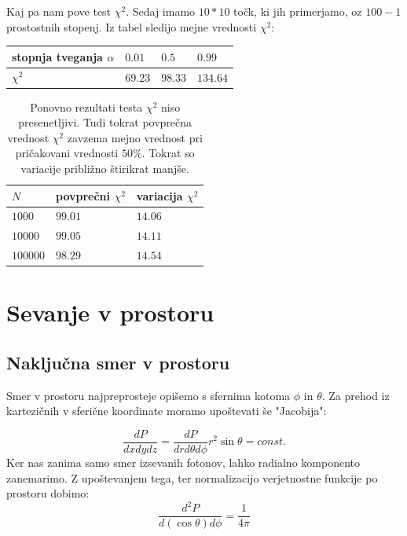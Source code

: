 \documentclass[slovene,11pt,a4paper]{article}
\numberwithin{equation}{section} %
\numberwithin{figure}{section} %
\numberwithin{table}{section} %
\begin{document}
Kaj pa nam pove test $\chi^2$. Sedaj imamo $10*10$ točk, ki jih primerjamo, oz $100-1$ prostostnih stopenj. Iz tabel sledijo mejne vrednosti $\chi^2$:

\begin{table}[!h]
\begin{center}
\begin{tabular}{|l|l|l|l|}
\hline
stopnja tveganja $\alpha$ & $0.01$ & $0.5$ & $0.99$ \\ \hline
$\chi^2$ & $69.23$ & $98.33$ & $134.64$ \\ \hline
\end{tabular}
\end{center}
\end{table}


\begin{table}[!h]
\begin{center}
\begin{tabular}{|l|l|l|}
\hline

$N$ & povprečni $\chi^2$ & variacija $\chi^2$  \\  \hline
$1000$ & $99.01$ & $14.06$ \\ \hline
$10000$ & $99.05$ & $14.11$  \\ \hline
$100000$ & $98.29$ & $14.54$  \\ \hline
\end{tabular}
\end{center}
\caption{Ponovno rezultati testa $\chi^2$ niso presenetljivi. Tudi tokrat povprečna vrednost $\chi^2$ zavzema mejno vrednost pri pričakovani vrednosti $50\%$. Tokrat so variacije približno štirikrat manjše. }
\end{table}








\section{Sevanje v prostoru}
\subsection{Naključna smer v prostoru}
Smer v prostoru najpreprosteje opišemo s sfernima kotoma $\phi$ in $\theta$. Za prehod iz kartezičnih v sferične koordinate moramo upoštevati še "Jacobija":

\begin{equation}
\frac{dP}{dx dy dz} = \frac{dP}{dr d\theta d\phi} r^2 \sin\theta = const.
\end{equation}
Ker nas zanima samo smer izsevanih fotonov, lahko radialno komponento zanemarimo. Z upoštevanjem tega, ter normalizacijo verjetnostne funkcije po prostoru dobimo:
\begin{equation}
\frac{d^2P}{d(\cos\theta) d\phi} =\frac{1}{4 \pi}
\end{equation}
\end{document}
